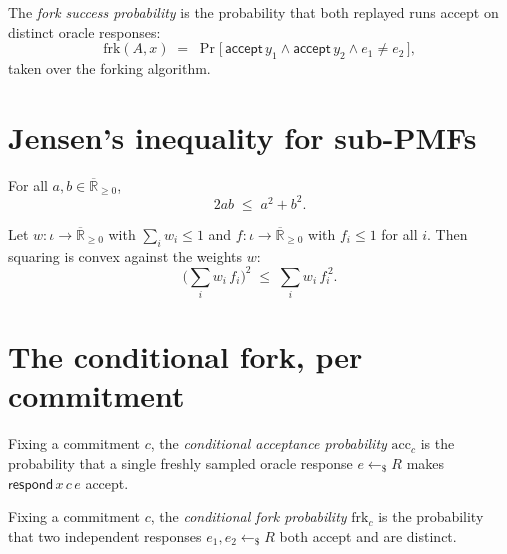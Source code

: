 \begin{definition}
  \label{def:fork-succ-prob}
  \leanok
  The \emph{fork success probability} is the probability that both replayed runs
  accept on distinct oracle responses:
  \[
    \mathrm{frk}(A,x) \;=\;
    \Pr\big[\,\mathsf{accept}\,y_1 \wedge \mathsf{accept}\,y_2 \wedge e_1 \neq e_2\,\big],
  \]
  taken over the forking algorithm.
\end{definition}

\section{Jensen's inequality for sub-PMFs}

\begin{lemma}
  \label{lem:ennreal-amgm}
  \leanok
  For all $a, b \in \overline{\mathbb{R}}_{\geq 0}$,
  \[
    2ab \;\leq\; a^2 + b^2 .
  \]
\end{lemma}

\begin{lemma}
  \label{lem:jensen-sub-pmf}
  \leanok
  Let $w : \iota \to \overline{\mathbb{R}}_{\geq 0}$ with
  $\sum_i w_i \leq 1$ and $f : \iota \to \overline{\mathbb{R}}_{\geq 0}$ with
  $f_i \leq 1$ for all $i$. Then squaring is convex against the weights $w$:
  \[
    \Big(\sum_i w_i\, f_i\Big)^2 \;\leq\; \sum_i w_i\, f_i^{\,2} .
  \]
\end{lemma}

\section{The conditional fork, per commitment}

\begin{definition}
  \label{def:cond-acc-prob}
  \leanok
  Fixing a commitment $c$, the \emph{conditional acceptance probability}
  $\mathrm{acc}_c$ is the probability that a single freshly sampled oracle
  response $e \leftarrow_{\$} R$ makes $\mathsf{respond}\,x\,c\,e$ accept.
\end{definition}

\begin{definition}
  \label{def:cond-fork-prob}
  \leanok
  Fixing a commitment $c$, the \emph{conditional fork probability}
  $\mathrm{frk}_c$ is the probability that two independent responses
  $e_1, e_2 \leftarrow_{\$} R$ both accept and are distinct.
\end{definition}

